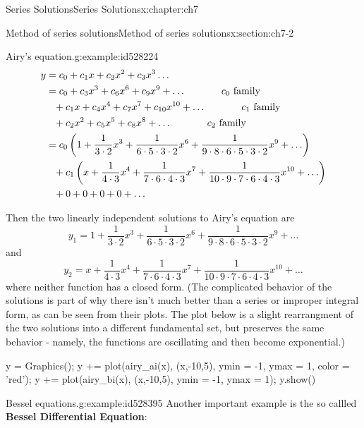 \documentclass[oneside,10pt,]{book}
\newcommand{\terminology}[1]{\textbf{#1}}
\numberwithin{equation}{section}
\numberwithin{equation}{section}
\newcommand{\amp}{&}
\begin{document}
\begin{chapterptx}{Series Solutions}{}{Series Solutions}{}{}{x:chapter:ch7}
\begin{sectionptx}{Method of series solutions}{}{Method of series solutions}{}{}{x:section:ch7-2}
\begin{example}{Airy's equation.}{g:example:id528224}
\begin{align*}
y \amp = c_0 + c_1 x + c_2 x^2 + c_3 x^3 \ldots\\
\amp = c_0 + c_3 x^3 + c_6 x^6 + c_9 x^9 + \ldots \hspace{.5in} c_0 \text{ family}\\
\amp \phantom{=} + c_1 x + c_4 x^4 + c_7 x^7 + c_{10} x^{10} + \ldots \hspace{.5in} c_1 \text{ family}\\
\amp \phantom{=} + c_2 x^2 + c_5 x^5 + c_8 x^8 + \ldots \hspace{.5in} c_2 \text{ family}\\
\amp = c_0\left( 1 + \frac{1}{3\cdot2} x^3 + \frac{1}{6\cdot5\cdot3\cdot2} x^6 + \frac{1}{9\cdot8\cdot6\cdot5\cdot3\cdot2}x^9 + \ldots \right)\\
\amp \phantom{=} + c_1\left( x + \frac{1}{4\cdot3} x^4 + \frac{1}{7\cdot6\cdot4\cdot3} x^7 + \frac{1}{10\cdot9\cdot 7\cdot6\cdot 4\cdot3} x^{10} + \ldots\right) \\
\amp \phantom{=} + 0 + 0 + 0 + 0 + \ldots 
\end{align*}
%
\par
Then the two linearly independent solutions to Airy's equation are%
\begin{equation*}
y_1 = 1 + \frac{1}{3\cdot2} x^3 + \frac{1}{6\cdot5\cdot3\cdot2} x^6 + \frac{1}{9\cdot8\cdot6\cdot5\cdot3\cdot2}x^9 + \ldots
\end{equation*}
and%
\begin{equation*}
y_2 = x + \frac{1}{4\cdot3} x^4 + \frac{1}{7\cdot6\cdot4\cdot3} x^7 + \frac{1}{10\cdot9\cdot 7\cdot6\cdot 4\cdot3} x^{10} + \ldots
\end{equation*}
where neither function has a closed form. (The complicated behavior of the solutions is part of why there isn't much better than a series or improper integral form, as can be seen from their plots. The plot below is a slight rearrangment of the two solutions into a different fundamental set, but preserves the same behavior - namely, the functions are oscillating and then become exponential.)%
\begin{sageinput}
y =  Graphics();
y += plot(airy_ai(x), (x,-10,5), ymin = -1, ymax = 1, color = 'red');
y += plot(airy_bi(x), (x,-10,5), ymin = -1, ymax = 1);
y.show()
\end{sageinput}
\end{example}
\begin{example}{Bessel equations.}{g:example:id528395}%
Another important example is the so callled \terminology{Bessel Differential Equation}:%

\end{example}
\end{sectionptx}
\end{chapterptx}
\end{document}
